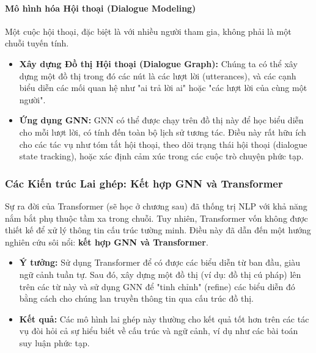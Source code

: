 \paragraph{Mô hình hóa Hội thoại (Dialogue Modeling)}
Một cuộc hội thoại, đặc biệt là với nhiều người tham gia, không phải là một chuỗi tuyến tính.
\begin{itemize}
    \item \textbf{Xây dựng Đồ thị Hội thoại (Dialogue Graph):} Chúng ta có thể xây dựng một đồ thị trong đó các nút là các lượt lời (utterances), và các cạnh biểu diễn các mối quan hệ như "ai trả lời ai" hoặc "các lượt lời của cùng một người".
    \item \textbf{Ứng dụng GNN:} GNN có thể được chạy trên đồ thị này để học biểu diễn cho mỗi lượt lời, có tính đến toàn bộ lịch sử tương tác. Điều này rất hữu ích cho các tác vụ như tóm tắt hội thoại, theo dõi trạng thái hội thoại (dialogue state tracking), hoặc xác định cảm xúc trong các cuộc trò chuyện phức tạp.
\end{itemize}

\subsubsection{Các Kiến trúc Lai ghép: Kết hợp GNN và Transformer}
\label{ssec:gnn_transformer}

Sự ra đời của Transformer (sẽ học ở chương sau) đã thống trị NLP với khả năng nắm bắt phụ thuộc tầm xa trong chuỗi. Tuy nhiên, Transformer vốn không được thiết kế để xử lý thông tin cấu trúc tường minh. Điều này đã dẫn đến một hướng nghiên cứu sôi nổi: \textbf{kết hợp GNN và Transformer}.
\begin{itemize}
    \item \textbf{Ý tưởng:} Sử dụng Transformer để có được các biểu diễn từ ban đầu, giàu ngữ cảnh tuần tự. Sau đó, xây dựng một đồ thị (ví dụ: đồ thị cú pháp) lên trên các từ này và sử dụng GNN để "tinh chỉnh" (refine) các biểu diễn đó bằng cách cho chúng lan truyền thông tin qua cấu trúc đồ thị.
    \item \textbf{Kết quả:} Các mô hình lai ghép này thường cho kết quả tốt hơn trên các tác vụ đòi hỏi cả sự hiểu biết về cấu trúc và ngữ cảnh, ví dụ như các bài toán suy luận phức tạp.
\end{itemize}

